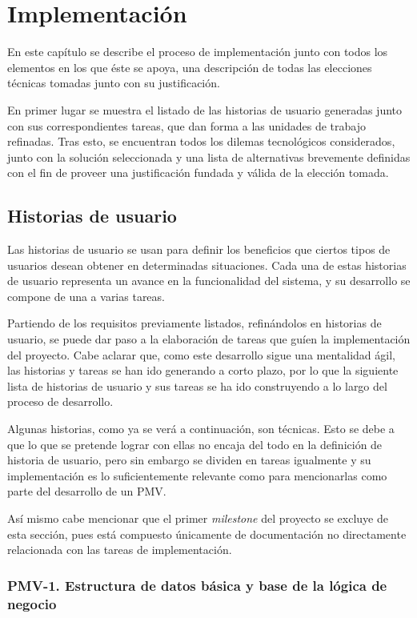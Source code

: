 \chapter{Implementación}

En este capítulo se describe el proceso de implementación junto con todos los elementos en los que éste se apoya, una descripción de todas las elecciones técnicas tomadas junto con su justificación.

En primer lugar se muestra el listado de las historias de usuario generadas junto con sus correspondientes tareas, que dan forma a las unidades de trabajo refinadas. Tras esto, se encuentran todos los dilemas tecnológicos considerados, junto con la solución seleccionada y  una lista de alternativas brevemente definidas con el fin de proveer una justificación fundada y válida de la elección tomada.

\section{Historias de usuario}

Las historias de usuario se usan para definir los beneficios que ciertos tipos de usuarios desean obtener en determinadas situaciones. Cada una de estas historias de usuario representa un avance en la funcionalidad del sistema, y su desarrollo se compone de una a varias tareas.

Partiendo de los requisitos previamente listados, refinándolos en historias de usuario, se puede dar paso a la elaboración de tareas que guíen la implementación del proyecto. Cabe aclarar que, como este desarrollo sigue una mentalidad ágil, las historias y tareas se han ido generando a corto plazo, por lo que la siguiente lista de historias de usuario y sus tareas se ha ido construyendo a lo largo del proceso de desarrollo.

Algunas historias, como ya se verá a continuación, son técnicas. Esto se debe a que lo que se pretende lograr con ellas no encaja del todo en la definición de historia de usuario, pero sin embargo se dividen en tareas igualmente y su implementación es lo suficientemente relevante como para mencionarlas como parte del desarrollo de un PMV.

Así mismo cabe mencionar que el primer \textit{milestone} del proyecto se excluye de esta sección, pues está compuesto únicamente de documentación no directamente relacionada con las tareas de implementación.

\subsection{PMV-1. Estructura de datos básica y base de la lógica de negocio}

